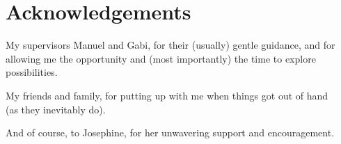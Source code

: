 
\chapter{Acknowledgements}

\begin{center}

My supervisors Manuel and Gabi, for their (usually) gentle guidance, and for
allowing me the opportunity and (most importantly) the time to explore possibilities.
\\\qquad

My friends and family, for putting up with me when things got out of hand\\
(as they inevitably do).
\\\qquad

And of course, to Josephine, for her unwavering support and encouragement.

\end{center}

